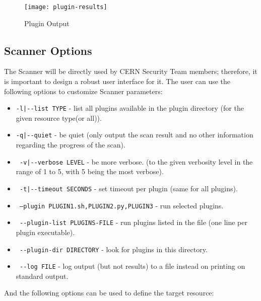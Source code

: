 \begin{figure}[h!]
  \centering
    \texttt{[image: plugin-results]}
  \caption{Plugin Output}
  \label{figure:plugin-results}
  
\end{figure}



\subsection{Scanner Options}
The Scanner will be directly used by CERN Security Team members; therefore, it is important to design a robust user interface for it. The user can use the following options to customize Scanner parameters:

\begin{itemize}

\item 

    \texttt{-l|-{}-list TYPE} - list all plugins available in the plugin directory 
                       (for the given resource type(or all)).
\item    \texttt{-q|-{}-quiet} - be quiet (only output the scan result and no other information regarding the progress of the scan).
\item    \texttt{    -v|-{}-verbose LEVEL} - be more verbose. 
    	 				 (to the given verbosity level in the range of 1 to 5,
    	 				  with 5 being the most verbose).
\item    \texttt{    -t|-{}-timeout SECONDS} - set timeout per plugin (same for all plugins).
\item    \texttt{    --plugin PLUGIN1.sh,PLUGIN2.py,PLUGIN3} - run selected plugins.
\item    \texttt{ -{}-plugin-list PLUGINS-FILE} - run plugins listed in the file (one line per plugin executable).
\item    \texttt{  -{}-plugin-dir DIRECTORY} - look for plugins in this directory. %
\item    \texttt{    -{}-log FILE} - log output (but not results) to a file instead on printing on standard output.  
\end{itemize}
\clearpage
And the following options can be used to define the target resource:
